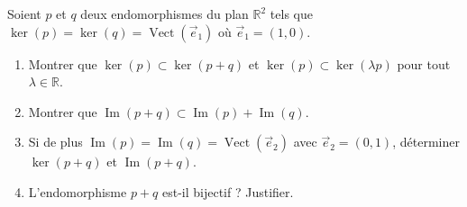 \documentclass[11pt]{article}
\begin{document}
\begin{exercice}
Soient $p$ et $q$ deux endomorphismes du plan $\mathbb{R}^2$ tels que $\ker(p) = \ker(q) = \operatorname{Vect}(\vec{e}_1)$ où $\vec{e}_1 = (1,0)$.
\begin{enumerate}
    \item Montrer que $\ker(p) \subset \ker(p+q)$ et $\ker(p) \subset \ker(\lambda p)$ pour tout $\lambda \in \mathbb{R}$.
    \item Montrer que $\operatorname{Im}(p+q) \subset \operatorname{Im}(p) + \operatorname{Im}(q)$.
    \item Si de plus $\operatorname{Im}(p) = \operatorname{Im}(q) = \operatorname{Vect}(\vec{e}_2)$ avec $\vec{e}_2 = (0,1)$, déterminer $\ker(p+q)$ et $\operatorname{Im}(p+q)$.
    \item L'endomorphisme $p+q$ est-il bijectif ? Justifier.
\end{enumerate}
\end{exercice}
\end{document}
